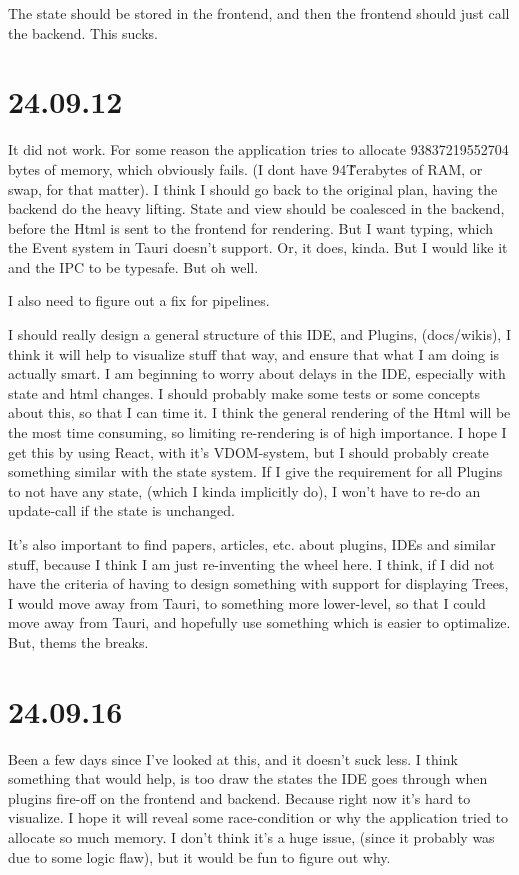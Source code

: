 The state should be stored in the frontend, and then the frontend should just call the backend.
This sucks.


\section{24.09.12}

It did not work. For some reason the application tries to allocate 93837219552704 bytes of memory,
which obviously fails. (I dont have 94\~ Terabytes of RAM, or swap, for that matter). I think I should
go back to the original plan, having the backend do the heavy lifting. State and view should be
coalesced in the backend, before the Html is sent to the frontend for rendering. But I want typing,
which the Event system in Tauri doesn't support. Or, it does, kinda. But I would like it and the IPC
to be typesafe. But oh well.

I also need to figure out a fix for pipelines.

I should really design a general structure of this IDE, and Plugins, (docs/wikis), I think it will help
to visualize stuff that way, and ensure that what I am doing is actually smart. I am beginning to worry
about delays in the IDE, especially with state and html changes. I should probably make some tests or
some concepts about this, so that I can time it. I think the general rendering of the Html will be the
most time consuming, so limiting re-rendering is of high importance. I hope I get this by using React,
with it's VDOM-system, but I should probably create something similar with the state system. If I give
the requirement for all Plugins to not have any state, (which I kinda implicitly do), I won't have to
re-do an update-call if the state is unchanged.

It's also important to find papers, articles, etc. about plugins, IDEs and similar stuff, because I think
I am just re-inventing the wheel here. I think, if I did not have the criteria of having to design
something with support for displaying Trees, I would move away from Tauri, to something more lower-level,
so that I could move away from Tauri, and hopefully use something which is easier to optimalize. But, thems
the breaks.


\section{24.09.16}

Been a few days since I've looked at this, and it doesn't suck less. I think something that would help, is
too draw the states the IDE goes through when plugins fire-off on the frontend and backend. Because right
now it's hard to visualize. I hope it will reveal some race-condition or why the application tried to
allocate so much memory. I don't think it's a huge issue, (since it probably was due to some logic flaw),
but it would be fun to figure out why.

